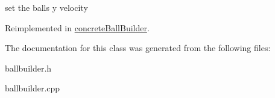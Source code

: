 set the ball\textquotesingle{}s y velocity 

Reimplemented in \mbox{\hyperlink{classconcrete_ball_builder_a6054b9012af3247b16f2e1c4040555cb}{concrete\+Ball\+Builder}}.



The documentation for this class was generated from the following files\+:\begin{DoxyCompactItemize}
\item 
ballbuilder.\+h\item 
ballbuilder.\+cpp\end{DoxyCompactItemize}
